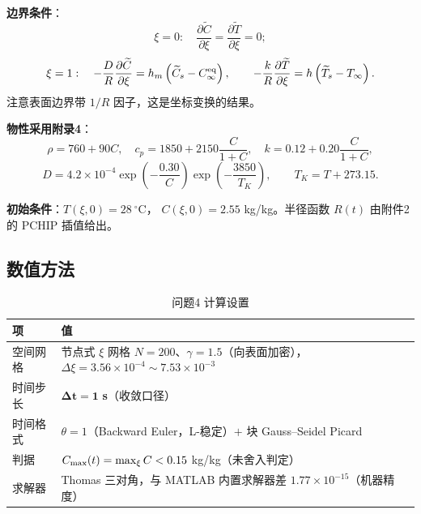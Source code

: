 \textbf{边界条件}：
\begin{equation}
  \xi=0:\quad \frac{\partial\widetilde C}{\partial\xi}
  =\frac{\partial\widetilde T}{\partial\xi}=0;
\end{equation}
\begin{equation}
  \xi=1:\quad
  -\frac{D}{R}\frac{\partial\widetilde C}{\partial\xi}
  =h_m\left(\widetilde C_s-C_\infty^{\mathrm{eq}}\right),\qquad
  -\frac{k}{R}\frac{\partial\widetilde T}{\partial\xi}
  =h\left(\widetilde T_s-T_\infty\right).
\end{equation}
注意表面边界带 $1/R$ 因子，这是坐标变换的结果。

\textbf{物性采用附录4}：
\begin{equation}
  \rho=760+90C,\quad
  c_p=1850+2150\frac{C}{1+C},\quad
  k=0.12+0.20\frac{C}{1+C},
\end{equation}
\begin{equation}
  D=4.2\times10^{-4}\exp\!\left(-\frac{0.30}{C}\right)
    \exp\!\left(-\frac{3850}{T_K}\right),\qquad T_K=T+273.15 .
\end{equation}

\textbf{初始条件}：$T(\xi,0)=28\ ^\circ\mathrm{C}$，
$C(\xi,0)=2.55$ kg/kg。半径函数 $R(t)$ 由附件2 的 PCHIP 插值给出。

\subsection{数值方法}

\begin{table}[H]
  \centering
  \caption{问题4 计算设置}
  \label{tab:p4num}
  \footnotesize
  \begin{tabular}{@{}ll@{}}
    \toprule
    项 & 值 \\
    \midrule
    空间网格 & 节点式 $\xi$ 网格 $N=200$、$\gamma=1.5$（向表面加密），
               $\Delta\xi=3.56\times10^{-4}\sim7.53\times10^{-3}$ \\
    时间步长 & $\boldsymbol{\Delta t=\mathbf{1}}$ \textbf{s}（收敛口径） \\
    时间格式 & $\theta=1$（Backward Euler，L-稳定）$+$ 块 Gauss--Seidel Picard \\
    判据 & $C_{\max}(t)=\max_\xi C<0.15$ kg/kg（未舍入判定） \\
    求解器 & Thomas 三对角，与 MATLAB 内置求解器差 $1.77\times10^{-15}$（机器精度） \\
    \bottomrule
  \end{tabular}
\end{table}

